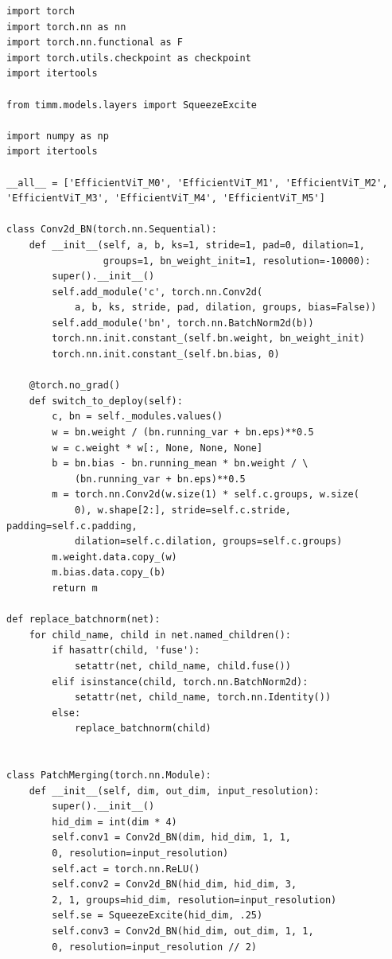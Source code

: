 \documentclass[12pt]{ctexart}
\begin{document}
\begin{lstlisting}
import torch
import torch.nn as nn
import torch.nn.functional as F
import torch.utils.checkpoint as checkpoint
import itertools
 
from timm.models.layers import SqueezeExcite
 
import numpy as np
import itertools
 
__all__ = ['EfficientViT_M0', 'EfficientViT_M1', 'EfficientViT_M2', 
'EfficientViT_M3', 'EfficientViT_M4', 'EfficientViT_M5']
 
class Conv2d_BN(torch.nn.Sequential):
    def __init__(self, a, b, ks=1, stride=1, pad=0, dilation=1,
                 groups=1, bn_weight_init=1, resolution=-10000):
        super().__init__()
        self.add_module('c', torch.nn.Conv2d(
            a, b, ks, stride, pad, dilation, groups, bias=False))
        self.add_module('bn', torch.nn.BatchNorm2d(b))
        torch.nn.init.constant_(self.bn.weight, bn_weight_init)
        torch.nn.init.constant_(self.bn.bias, 0)
 
    @torch.no_grad()
    def switch_to_deploy(self):
        c, bn = self._modules.values()
        w = bn.weight / (bn.running_var + bn.eps)**0.5
        w = c.weight * w[:, None, None, None]
        b = bn.bias - bn.running_mean * bn.weight / \
            (bn.running_var + bn.eps)**0.5
        m = torch.nn.Conv2d(w.size(1) * self.c.groups, w.size(
            0), w.shape[2:], stride=self.c.stride, padding=self.c.padding, 
            dilation=self.c.dilation, groups=self.c.groups)
        m.weight.data.copy_(w)
        m.bias.data.copy_(b)
        return m
 
def replace_batchnorm(net):
    for child_name, child in net.named_children():
        if hasattr(child, 'fuse'):
            setattr(net, child_name, child.fuse())
        elif isinstance(child, torch.nn.BatchNorm2d):
            setattr(net, child_name, torch.nn.Identity())
        else:
            replace_batchnorm(child)
            
 
class PatchMerging(torch.nn.Module):
    def __init__(self, dim, out_dim, input_resolution):
        super().__init__()
        hid_dim = int(dim * 4)
        self.conv1 = Conv2d_BN(dim, hid_dim, 1, 1, 
        0, resolution=input_resolution)
        self.act = torch.nn.ReLU()
        self.conv2 = Conv2d_BN(hid_dim, hid_dim, 3, 
        2, 1, groups=hid_dim, resolution=input_resolution)
        self.se = SqueezeExcite(hid_dim, .25)
        self.conv3 = Conv2d_BN(hid_dim, out_dim, 1, 1, 
        0, resolution=input_resolution // 2)
 

\end{lstlisting}
\end{document}
